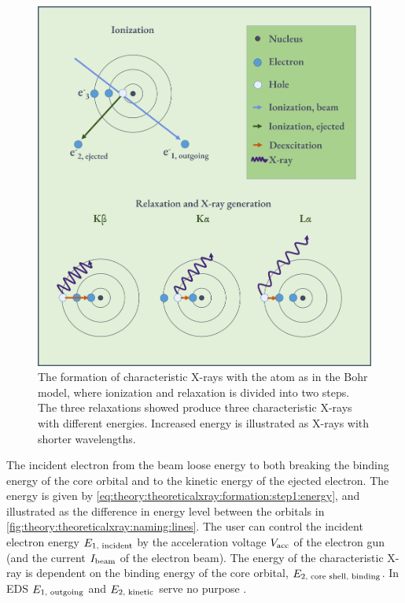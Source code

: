 \begin{figure}[htb]
    \centering
    \includegraphics[width=0.85\linewidth]{figures/formation_of_xrays_bohr.png}
    \caption{
        The formation of characteristic X-rays with the atom as in the Bohr model, where ionization and relaxation is divided into two steps.
        The three relaxations showed produce three characteristic X-rays with different energies.
        Increased energy is illustrated as X-rays with shorter wavelengths.
    }
    \label{fig:theory:theoreticalxray:formation}
\end{figure}


The incident electron from the beam loose energy to both breaking the binding energy of the core orbital and to the kinetic energy of the ejected electron.
The energy is given by \cref{eq:theory:theoreticalxray:formation:step1:energy}, and illustrated as the difference in energy level between the orbitals in \cref{fig:theory:theoreticalxray:naming:lines}.
The user can control the incident electron energy $E_{1 {\textnormal{, incident}}}$ by the acceleration voltage $V_{\textnormal{acc}}$ of the electron gun (and the current $I_{\textnormal{beam}}$ of the electron beam).
The energy of the characteristic X-ray is dependent on the binding energy of the core orbital, $E_{2 {\textnormal{, core shell, binding}}}$.
In EDS $E_{1 {\textnormal{, outgoing}}}$ and $E_{2 {\textnormal{, kinetic}}}$ serve no purpose \cite[Eq. (4.1)]{goldstein_scanning_2018}.

